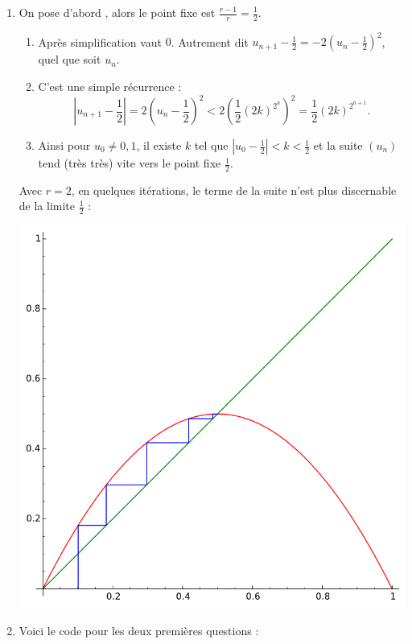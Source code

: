 \documentclass[class=report,crop=false]{standalone}
\begin{document}
\begin{enumerate}
  \item On pose d'abord , alors le point fixe est $\frac{r-1}{r}= \frac12$.
  \begin{enumerate}
    \item Après simplification  vaut $0$.
    Autrement dit $u_{n+1}-\frac12 = -2(u_n-\frac12)^2$, quel que soit $u_n$.
    \item C'est une simple récurrence :
    $$\left|u_{n+1}-\frac12\right|  = 2 \left(u_n-\frac12\right)^2 
    < 2\left(\frac12 (2k)^{2^n}\right)^2 = \frac12 (2k)^{2^{n+1}}.$$
    \item Ainsi pour $u_0 \neq 0,1$, il existe $k$ tel que $|u_0-\frac12| < k < \frac12$
    et la suite $(u_n)$ tend (très très) vite vers le point fixe $\frac12$.
  \end{enumerate} 
  
  Avec $r=2$, en quelques itérations, le terme de la suite 
  n'est plus discernable de la limite $\frac12$ :
  \begin{center}
  \includegraphics[scale=0.4]{figures/chaos6}  
  \end{center}   
  
  \item  Voici le code pour les deux premières questions :
  


\end{enumerate}
\end{document}
